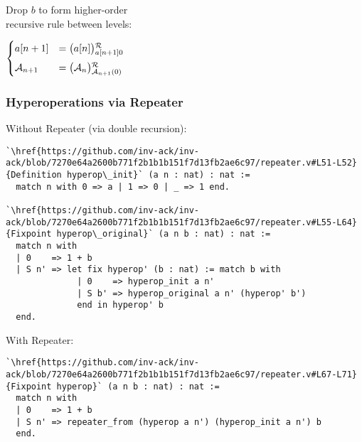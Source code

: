 \begin{frame}[fragile]
\smallskip

\pause 
\begin{minipage}{0.4\linewidth}
	Drop $b$ to form higher-order \\ recursive rule between levels:
\end{minipage}
\quad 
$\begin{cases}
\displaystyle a[n+1] & = \rf{\big(a[n]\big)}{a[n+1]0} \\[5pt]
\Ack_{n+1} & = \rf{\big(\Ack_n\big)}{\Ack_{n+1}(0)}
\end{cases}$

\end{frame}


\begin{frame}[fragile]
\frametitle{Hyperoperations via Repeater}
Without Repeater (via double recursion):
\begin{lstlisting}
`\href{https://github.com/inv-ack/inv-ack/blob/7270e64a2600b771f2b1b1b151f7d13fb2ae6c97/repeater.v#L51-L52}{Definition hyperop\_init}` (a n : nat) : nat :=
  match n with 0 => a | 1 => 0 | _ => 1 end.

`\href{https://github.com/inv-ack/inv-ack/blob/7270e64a2600b771f2b1b1b151f7d13fb2ae6c97/repeater.v#L55-L64}{Fixpoint hyperop\_original}` (a n b : nat) : nat :=
  match n with
  | 0    => 1 + b
  | S n' => let fix hyperop' (b : nat) := match b with
              | 0    => hyperop_init a n'
              | S b' => hyperop_original a n' (hyperop' b')
              end in hyperop' b
  end.
\end{lstlisting}

\pause 
With Repeater:
\begin{lstlisting} 
`\href{https://github.com/inv-ack/inv-ack/blob/7270e64a2600b771f2b1b1b151f7d13fb2ae6c97/repeater.v#L67-L71}{Fixpoint hyperop}` (a n b : nat) : nat :=
  match n with
  | 0    => 1 + b
  | S n' => repeater_from (hyperop a n') (hyperop_init a n') b
  end.
\end{lstlisting}
\end{frame}


